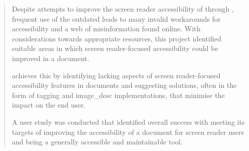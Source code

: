 
\begin{abstract}
Despite attempts to improve the screen reader accessibility of \latexspaced through \lualatex , frequent use of the outdated \pdflatexspaced leads to many invalid workarounds for accessibility and a web of misinformation found online. With considerations towards appropriate resources, this project identified suitable areas in which screen reader-focused accessibility could be improved in a \latexspaced document.

\lintexspaced achieves this by identifying lacking aspects of screen reader-focused accessibility features in \latexspaced documents and suggesting solutions, often in the form of \gls{tagging} and \gls{image_desc} implementations, that minimise the impact on the end user.

A user study was conducted that identified overall success with \lintexspaced meeting its targets of improving the accessibility of a \latexspaced document for screen reader users and being a generally accessible and maintainable tool.
\end{abstract}